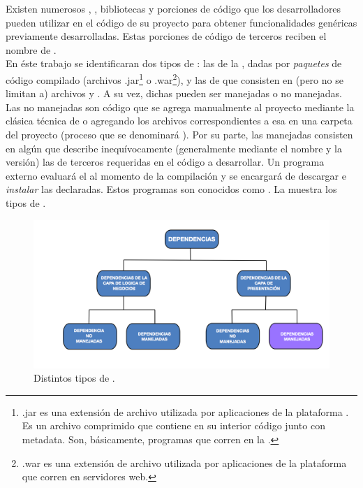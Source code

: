 Existen numerosos \frameworks, \toolkits, bibliotecas y porciones de código 
que los desarrolladores pueden utilizar en el código de su proyecto para 
obtener funcionalidades genéricas previamente desarrolladas. Estas porciones 
de código de terceros reciben el nombre de \dependencies.\\
En éste trabajo se identificaran dos tipos de \dependencies: las de la 
\logictier, dadas por \emph{paquetes} de código \java compilado (archivos 
.jar\footnote{
	.jar es una extensión de archivo utilizada por aplicaciones de la 
	plataforma \java. Es un archivo comprimido que contiene en su interior
	código \bytecode \java junto con metadata. Son, básicamente, programas que
	corren en la \jvm.
} 
o .war\footnote{
	.war es una extensión de archivo utilizada por aplicaciones de la 
	plataforma \java que corren en servidores web.
}), y las de \viewtier que consisten en (pero no se limitan a) archivos 
\css y \js. A su vez, dichas \dependencies pueden ser manejadas o no 
manejadas.\\
Las \dependencies no manejadas son código que se agrega manualmente al
proyecto mediante la clásica técnica de  o agregando los 
archivos correspondientes a esa \dependency en una carpeta del proyecto 
(proceso que se denominará ). Por su parte, las \dependencies 
manejadas consisten en algún \conffile que describe inequívocamente 
(generalmente mediante el nombre y la versión) las \dependencies de terceros 
requeridas en el código a desarrollar. Un programa externo evaluará el 
\conffile al momento de la compilación y se encargará de descargar e 
\emph{instalar} las \dependencies declaradas. Estos programas son conocidos 
como \depmgrs. La  muestra los tipos de \dependencies.

\begin{figure}[tb]
	\centering
	\includegraphics[]{figures/dep_types.png}
	\caption{Distintos tipos de \dependencies.}
	\label{fig:intro:jvm:dep_types}
\end{figure}

